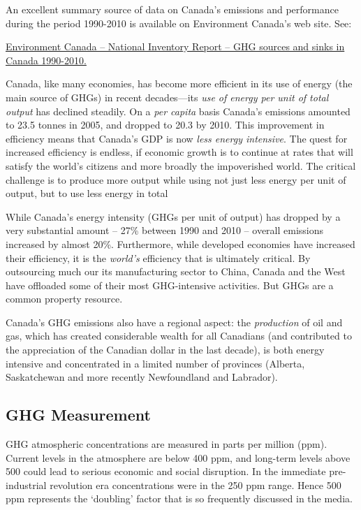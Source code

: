 An excellent summary source of data on Canada's emissions and performance during the period 1990-2010 is available on Environment Canada's web site. See:

\href{http://www.ec.gc.ca/Publications/A91164E0-7CEB-4D61-841C-BEA8BAA223F9/Executive-Summary-2012\_WEB-v3.pdf}{Environment Canada -- National Inventory Report -- GHG sources and sinks in Canada 1990-2010.}

Canada, like many economies, has become more efficient in its use of energy (the main source of GHGs) in recent decades---its \textit{use of energy per unit of total output} has declined steadily. On a \textit{per capita} basis Canada's emissions amounted to 23.5 tonnes in 2005, and dropped to 20.3 by 2010. This improvement in efficiency means that Canada's GDP is now \textit{less energy intensive}. The quest for increased efficiency is endless, if economic growth is to continue at rates that will satisfy the world's citizens and more broadly the impoverished world. The critical challenge is to produce more output while using not just less energy per unit of output, but to use less energy in total

While Canada's energy intensity (GHGs per unit of output) has dropped by a very substantial amount -- 27\% between 1990 and 2010 -- overall emissions increased by almost 20\%. Furthermore, while developed economies have increased their efficiency, it is the \textit{world's} efficiency that is ultimately critical. By outsourcing much our its manufacturing sector to China, Canada and the West have offloaded some of their most GHG-intensive activities. But GHGs are a common property resource.

Canada's GHG emissions also have a regional aspect: the \textit{production} of oil and gas, which has created considerable wealth for all Canadians (and contributed to the appreciation of the Canadian dollar in the last decade), is both energy intensive and concentrated in a limited number of provinces (Alberta, Saskatchewan and more recently Newfoundland and Labrador).

\subsection*{GHG Measurement}

GHG atmospheric concentrations are measured in parts per million (ppm). Current levels in the atmosphere are below 400 ppm, and long-term levels above 500 could lead to serious economic and social disruption. In the immediate pre-industrial revolution era concentrations were in the 250 ppm range. Hence 500 ppm represents the `doubling' factor that is so frequently discussed in the media. 

